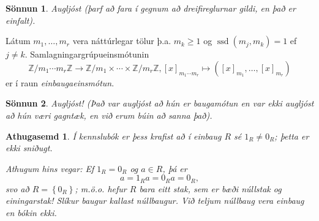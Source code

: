 \documentclass[a4paper,icelandic,11pt]{book}
\theoremstyle{plain}
\newtheorem*{ath}{Athugasemd}
\newtheorem*{sonnun}{Sönnun}
\newcommand{\Z}{\mathbb{Z}}
\DeclareMathOperator{\ssd}{ssd} %
\begin{document}
\begin{sonnun}
  Augljóst (þarf að fara í gegnum að dreifireglurnar gildi, en það er einfalt).
\end{sonnun}
\begin{setn}
  Látum $m_1,\dots,m_r$ vera náttúrlegar tölur þ.a. $m_k\geq 1$ og
  $\ssd(m_j,m_k)=1$ ef $j\neq k$. Samlagningargrúpueinsmótunin
  \[
    \Z/m_1\cdots m_r\Z\to \Z/m_1\times\cdots\times \Z/m_r\Z,
    [x]_{m_1\cdots m_r} \mapsto ([x]_{m_1},\dots,[x]_{m_r})
  \]
  er í raun \emph{einbaugaeinsmótun}.
\end{setn}
\begin{sonnun}
  Augljóst! (Það var augljóst að hún er baugamótun en var ekki augljóst að hún
  væri gagntæk, en við erum búin að sanna það).
\end{sonnun}
\begin{ath}
  Í kennslubók er þess krafist að í einbaug $R$ sé $1_R\neq 0_R$; þetta er ekki 
  sniðugt.
  
  Athugum hins vegar: Ef $1_R = 0_R$ og $a \in R$, þá er
  \[
    a = 1_R a = 0_R a = 0_R,
  \]
  svo að $R = \left\{ 0_R \right\}$; m.ö.o. hefur $R$ bara eitt stak, sem er 
  bæði núllstak og einingarstak! Slíkur baugur kallast
  \emph{núllbaugur}.
  Við teljum núllbaug vera einbaug en bókin ekki.
\end{ath}
\end{document}
